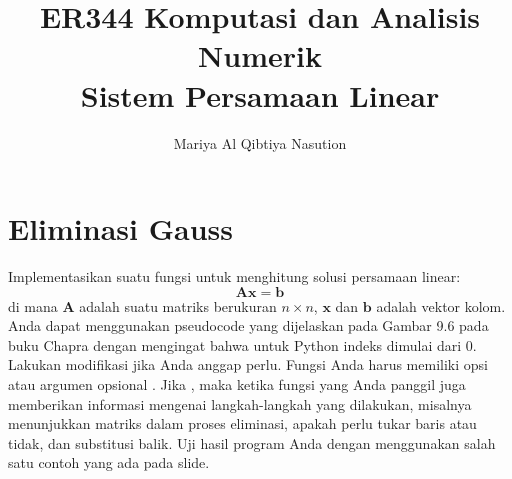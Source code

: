 



\title{%
{\small ER344 Komputasi dan Analisis Numerik}\\
Sistem Persamaan Linear
}
\author{Mariya Al Qibtiya Nasution}
\date{}
\maketitle


\section{Eliminasi Gauss}

\begin{soal}
Implementasikan suatu fungsi untuk menghitung solusi persamaan linear:
\begin{equation*}
\mathbf{A}\mathbf{x} = \mathbf{b}
\end{equation*}
di mana $\mathbf{A}$ adalah suatu matriks berukuran $n \times n$, 
$\mathbf{x}$ dan $\mathbf{b}$ adalah vektor kolom.
Anda dapat menggunakan pseudocode yang dijelaskan pada Gambar 9.6
pada buku Chapra dengan mengingat bahwa untuk Python indeks dimulai dari 0.
Lakukan modifikasi jika Anda anggap perlu.
Fungsi Anda harus memiliki opsi atau argumen opsional .
Jika , maka ketika fungsi yang Anda panggil juga
memberikan informasi mengenai langkah-langkah yang dilakukan, misalnya
menunjukkan matriks dalam proses eliminasi, apakah perlu tukar baris atau tidak,
dan substitusi balik. Uji hasil program Anda dengan menggunakan salah satu contoh
yang ada pada slide.
\end{soal}

